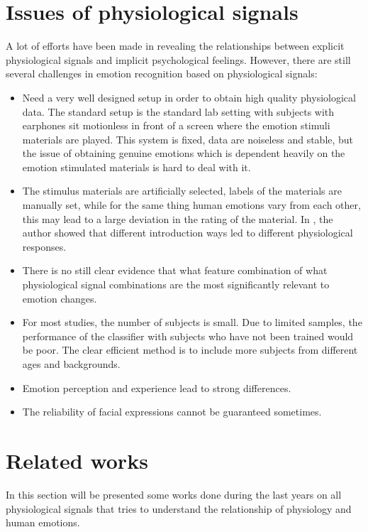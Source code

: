 \section{Issues of physiological signals}
A lot of efforts have been made in revealing the relationships between explicit physiological signals and implicit psychological feelings. However, there are still several challenges in emotion recognition based on physiological signals:
\begin{itemize}
	\item Need a very well designed setup in order to obtain high quality physiological data. The standard setup is the standard lab setting with subjects with earphones  sit motionless in front of a screen where the emotion stimuli materials are played. This system is fixed, data are noiseless and stable, but the issue of obtaining genuine emotions which is dependent heavily on the emotion stimulated materials is hard to deal with it.
	\item The stimulus materials are artificially selected, labels of the materials are manually set, while for the same thing human emotions vary from each other, this may lead to a large deviation in the rating of the material. In \cite{muhl2011modality}, the author showed that different introduction ways led to different physiological responses.
	\item There is no still clear evidence that what feature combination of what physiological signal combinations are the most significantly relevant to emotion changes.
	\item For most studies, the number of subjects is small. Due to limited samples, the performance of the classifier with subjects who have not been trained would be poor. The clear efficient method is to include more subjects from different ages and backgrounds.
	\item Emotion perception and experience lead to strong differences.
	\item The reliability of facial expressions cannot be guaranteed sometimes.
\end{itemize}

\section{Related works}
In this section will be presented some works done during the last years on all physiological signals that tries to understand the relationship of physiology and human emotions.

